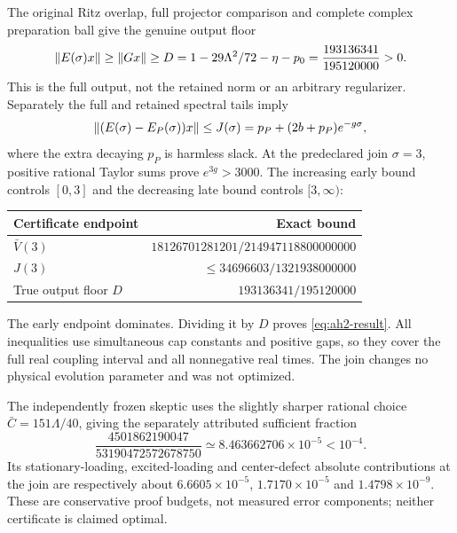 The original Ritz overlap, full projector comparison and complete complex preparation ball give the genuine output floor
\begin{equation}
 \left\lVert E(\sigma)x\right\rVert\ge\left\lVert Gx\right\rVert\ge
 D=1-29\Lambda^2/72-\eta-p_0
 =\frac{193136341}{195120000}>0.
 \label{eq:ah2-true-D}
\end{equation}
This is the full output, not the retained norm or an arbitrary regularizer. Separately the full and retained spectral tails imply
\begin{equation}
 \left\lVert(E(\sigma)-E_P(\sigma))x\right\rVert\le
 J(\sigma)=p_P+(2b+p_P)e^{-g\sigma},
 \label{eq:ah2-J}
\end{equation}
where the extra decaying $p_P$ is harmless slack. At the predeclared join $\sigma=3$, positive rational Taylor sums prove $e^{3g}>3000$. The increasing early bound controls $[0,3]$ and the decreasing late bound controls $[3,\infty)$:
\begin{center}\small
\begin{tabular}{@{}lr@{}}\toprule
Certificate endpoint & Exact bound\\\midrule
$\bar V(3)$ & $18126701281201/214947118800000000$\\
$J(3)$ & $\le34696603/1321938000000$\\
True output floor $D$ & $193136341/195120000$\\\bottomrule
\end{tabular}
\end{center}
The early endpoint dominates. Dividing it by $D$ proves \eqref{eq:ah2-result}. All inequalities use simultaneous cap constants and positive gaps, so they cover the full real coupling interval and all nonnegative real times. The join changes no physical evolution parameter and was not optimized.

The independently frozen skeptic uses the slightly sharper rational choice $\bar C=151\Lambda/40$, giving the separately attributed sufficient fraction
\begin{equation}
 \frac{4501862190047}{53190472572678750}
 \simeq8.463662706\times10^{-5}<10^{-4}.
\end{equation}
Its stationary-loading, excited-loading and center-defect absolute contributions at the join are respectively about $6.6605\times10^{-5}$, $1.7170\times10^{-5}$ and $1.4798\times10^{-9}$. These are conservative proof budgets, not measured error components; neither certificate is claimed optimal.

